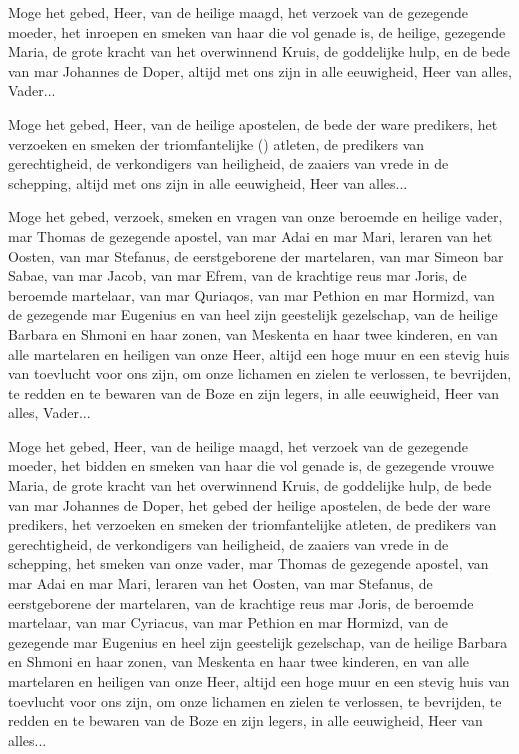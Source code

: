 \documentclass[12pt,twoside,a5paper]{article}
\begin{document}
\begin{halfparskip}
    Moge het gebed, Heer, van de heilige maagd, het verzoek van de gezegende moeder, het inroepen en smeken van haar die vol genade is, de heilige, gezegende Maria, de grote kracht van het overwinnend Kruis, de goddelijke hulp, en de bede van mar Johannes de Doper, altijd met ons zijn in alle eeuwigheid, Heer van alles, Vader...

   Moge het gebed, Heer, van de heilige apostelen, de bede der ware predikers, het verzoeken en smeken der triomfantelijke () atleten, de predikers van gerechtigheid, de verkondigers van heiligheid, de zaaiers van vrede in de schepping, altijd met ons zijn in alle eeuwigheid, Heer van alles...

   Moge het gebed, verzoek, smeken en vragen van onze beroemde en heilige vader, mar Thomas de gezegende apostel, van mar Adai en mar Mari, leraren van het Oosten, van mar Stefanus, de eerstgeborene der martelaren, van mar Simeon bar Sabae, van mar Jacob, van mar Efrem, van de krachtige reus mar Joris, de beroemde martelaar, van mar Quriaqos, van mar Pethion en mar Hormizd, van de gezegende mar Eugenius en van heel zijn geestelijk gezelschap, van de heilige Barbara en Shmoni en haar zonen, van Meskenta en haar twee kinderen, en van alle martelaren en heiligen van onze Heer, altijd een hoge muur en een stevig huis van toevlucht voor ons zijn, om onze lichamen en zielen te verlossen, te bevrijden, te redden en te bewaren van de Boze en zijn legers, in alle eeuwigheid, Heer van alles, Vader...
\end{halfparskip}

\begin{halfparskip}
  \fullline
   Moge het gebed, Heer, van de heilige maagd, het verzoek van de gezegende moeder, het bidden en smeken van haar die vol genade is, de gezegende vrouwe Maria, de grote kracht van het overwinnend Kruis, de goddelijke hulp, de bede van mar Johannes de Doper, het gebed der heilige apostelen, de bede der ware predikers, het verzoeken en smeken der triomfantelijke atleten, de predikers van gerechtigheid, de verkondigers van heiligheid, de zaaiers van vrede in de schepping, het smeken van onze vader, mar Thomas de gezegende apostel, van mar Adai en mar Mari, leraren van het Oosten, van mar Stefanus, de eerstgeborene der martelaren, van de krachtige reus mar Joris, de beroemde martelaar, van mar Cyriacus, van mar Pethion en mar Hormizd, van de gezegende mar Eugenius en heel zijn geestelijk gezelschap, van de heilige Barbara en Shmoni en haar zonen, van Meskenta en haar twee kinderen, en van alle martelaren en heiligen van onze Heer, altijd een hoge muur en een stevig huis van toevlucht voor ons zijn, om onze lichamen en zielen te verlossen, te bevrijden, te redden en te bewaren van de Boze en zijn legers, in alle eeuwigheid, Heer van alles...
\end{halfparskip}
\end{document}
